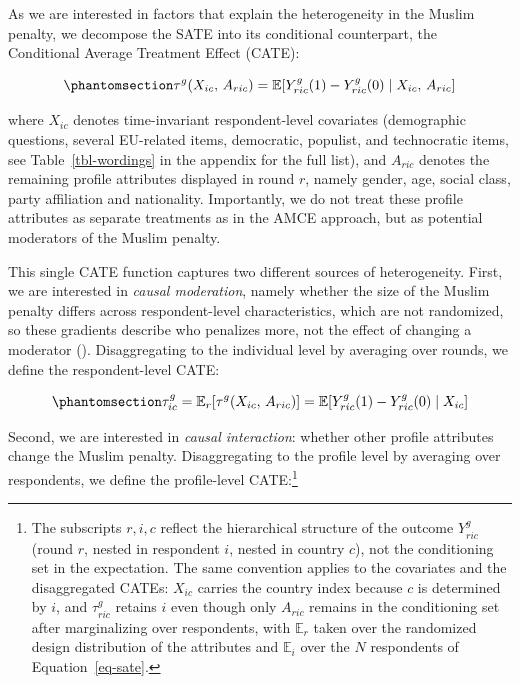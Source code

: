 \documentclass[
  10pt,
  a4paper,
  DIV=11,
  numbers=noendperiod]{scrartcl}
\begin{document}
As we are interested in factors that explain the heterogeneity in the
Muslim penalty, we decompose the SATE into its conditional counterpart,
the Conditional Average Treatment Effect (CATE):

\begin{equation}\protect\phantomsection\label{eq-cate1}{
    \tau^{g}(X_{ic},\, A_{ric}) =
        \mathbb{E}\!\left[
            Y_{ric}^{g}(1) - Y_{ric}^{g}(0)
            \;\middle|\;
            X_{ic},\, A_{ric}
        \right]
}\end{equation}

\noindent where \(X_{ic}\) denotes time-invariant respondent-level
covariates (demographic questions, several EU-related items, democratic,
populist, and technocratic items, see Table~\ref{tbl-wordings} in the
appendix for the full list), and \(A_{ric}\) denotes the remaining
profile attributes displayed in round \(r\), namely gender, age, social
class, party affiliation and nationality. Importantly, we do not treat
these profile attributes as separate treatments as in the AMCE approach,
but as potential moderators of the Muslim penalty.

This single CATE function captures two different sources of
heterogeneity. First, we are interested in \emph{causal moderation},
namely whether the size of the Muslim penalty differs across
respondent-level characteristics, which are not randomized, so these
gradients describe who penalizes more, not the effect of changing a
moderator ().
Disaggregating to the individual level by averaging over rounds, we
define the respondent-level CATE:

\begin{equation}\protect\phantomsection\label{eq-cate-respondent}{
    \tau_{ic}^{g}
        = \mathbb{E}_{r}\!\left[\tau^{g}(X_{ic},\, A_{ric})\right]
        = \mathbb{E}\!\left[
            Y_{ric}^{g}(1) - Y_{ric}^{g}(0)
            \;\middle|\;
            X_{ic}
          \right]
}\end{equation}

Second, we are interested in \emph{causal interaction}: whether other
profile attributes change the Muslim penalty. Disaggregating to the
profile level by averaging over respondents, we define the profile-level
CATE:\footnote{The subscripts \(r, i, c\) reflect the hierarchical
  structure of the outcome \(Y_{ric}^g\) (round \(r\), nested in
  respondent \(i\), nested in country \(c\)), not the conditioning set
  in the expectation. The same convention applies to the covariates and
  the disaggregated CATEs: \(X_{ic}\) carries the country index because
  \(c\) is determined by \(i\), and \(\tau_{ric}^g\) retains \(i\) even
  though only \(A_{ric}\) remains in the conditioning set after
  marginalizing over respondents, with \(\mathbb{E}_r\) taken over the
  randomized design distribution of the attributes and \(\mathbb{E}_i\)
  over the \(N\) respondents of Equation~\ref{eq-sate}.}
\end{document}

